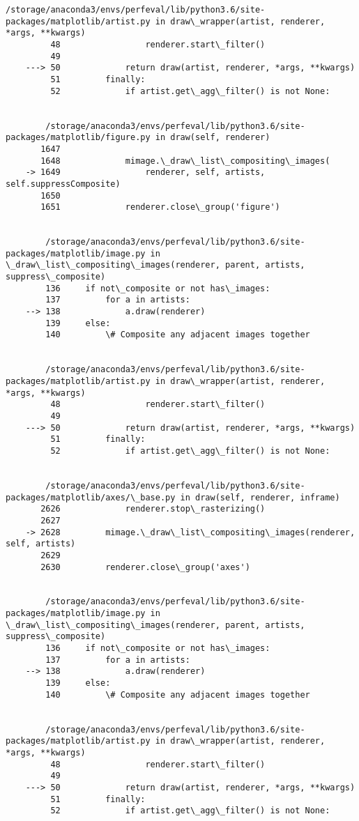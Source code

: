 \documentclass[11pt]{article}
\begin{document}
\begin{Verbatim}[commandchars=\\\{\}]
        /storage/anaconda3/envs/perfeval/lib/python3.6/site-packages/matplotlib/artist.py in draw\_wrapper(artist, renderer, *args, **kwargs)
         48                 renderer.start\_filter()
         49 
    ---> 50             return draw(artist, renderer, *args, **kwargs)
         51         finally:
         52             if artist.get\_agg\_filter() is not None:


        /storage/anaconda3/envs/perfeval/lib/python3.6/site-packages/matplotlib/figure.py in draw(self, renderer)
       1647 
       1648             mimage.\_draw\_list\_compositing\_images(
    -> 1649                 renderer, self, artists, self.suppressComposite)
       1650 
       1651             renderer.close\_group('figure')


        /storage/anaconda3/envs/perfeval/lib/python3.6/site-packages/matplotlib/image.py in \_draw\_list\_compositing\_images(renderer, parent, artists, suppress\_composite)
        136     if not\_composite or not has\_images:
        137         for a in artists:
    --> 138             a.draw(renderer)
        139     else:
        140         \# Composite any adjacent images together


        /storage/anaconda3/envs/perfeval/lib/python3.6/site-packages/matplotlib/artist.py in draw\_wrapper(artist, renderer, *args, **kwargs)
         48                 renderer.start\_filter()
         49 
    ---> 50             return draw(artist, renderer, *args, **kwargs)
         51         finally:
         52             if artist.get\_agg\_filter() is not None:


        /storage/anaconda3/envs/perfeval/lib/python3.6/site-packages/matplotlib/axes/\_base.py in draw(self, renderer, inframe)
       2626             renderer.stop\_rasterizing()
       2627 
    -> 2628         mimage.\_draw\_list\_compositing\_images(renderer, self, artists)
       2629 
       2630         renderer.close\_group('axes')


        /storage/anaconda3/envs/perfeval/lib/python3.6/site-packages/matplotlib/image.py in \_draw\_list\_compositing\_images(renderer, parent, artists, suppress\_composite)
        136     if not\_composite or not has\_images:
        137         for a in artists:
    --> 138             a.draw(renderer)
        139     else:
        140         \# Composite any adjacent images together


        /storage/anaconda3/envs/perfeval/lib/python3.6/site-packages/matplotlib/artist.py in draw\_wrapper(artist, renderer, *args, **kwargs)
         48                 renderer.start\_filter()
         49 
    ---> 50             return draw(artist, renderer, *args, **kwargs)
         51         finally:
         52             if artist.get\_agg\_filter() is not None:



\end{Verbatim}
\end{document}
